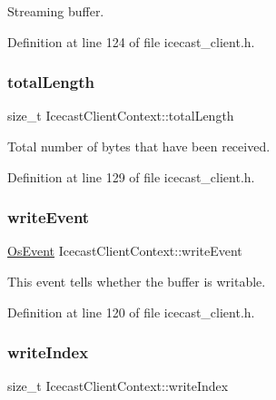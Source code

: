 Streaming buffer. 



Definition at line 124 of file icecast\+\_\+client.\+h.

\mbox{\label{structIcecastClientContext_a743e7a8432fedd8a4e301276708d7420}} 
\subsubsection{\texorpdfstring{total\+Length}{totalLength}}
{\footnotesize\ttfamily size\+\_\+t Icecast\+Client\+Context\+::total\+Length}



Total number of bytes that have been received. 



Definition at line 129 of file icecast\+\_\+client.\+h.

\mbox{\label{structIcecastClientContext_a176c1feb7963f60a5dc8044f7d6002c4}} 
\subsubsection{\texorpdfstring{write\+Event}{writeEvent}}
{\footnotesize\ttfamily \hyperlink{structOsEvent}{Os\+Event} Icecast\+Client\+Context\+::write\+Event}



This event tells whether the buffer is writable. 



Definition at line 120 of file icecast\+\_\+client.\+h.

\mbox{\label{structIcecastClientContext_aa437385bcf8e7e12307da9d69ef2765a}} 
\subsubsection{\texorpdfstring{write\+Index}{writeIndex}}
{\footnotesize\ttfamily size\+\_\+t Icecast\+Client\+Context\+::write\+Index}




